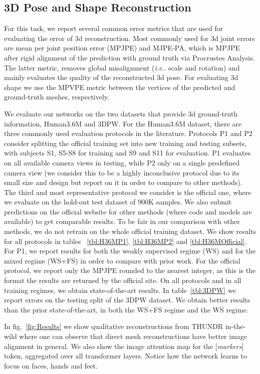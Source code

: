 \documentclass[10pt,twocolumn,letterpaper]{article}
\makeatletter
\DeclareRobustCommand\onedot{\futurelet\@let@token\@onedot}
\def\@onedot{\ifx\@let@token.\else.\null\fi\xspace}
\def\ie{\emph{i.e}\onedot} \def\Ie{\emph{I.e}\onedot}
\makeatother
\begin{document}
\subsection{3D Pose and Shape Reconstruction}

For this task, we report several common error metrics that are used for
evaluating the error of 3d reconstruction. Most commonly used for 3d joint errors are mean per joint position error (MPJPE) and MJPE-PA, which is MPJPE after rigid alignment of the prediction with ground truth via Procrustes Analysis. The latter metric, removes global misalignment (\ie scale and rotation) and mainly evaluates the quality of the reconstructed 3d pose. For evaluating 3d shape we use the MPVPE metric between the vertices of the predicted and ground-truth meshes, respectively.

We evaluate our networks on the two datasets that provide 3d ground-truth information, Human3.6M and 3DPW. For the Human3.6M dataset, there are three commonly used evaluation protocols in the literature. Protocols P1 and P2 consider splitting the official training set into new training and testing subsets, with subjects S1, S5-S8 for training and S9 and S11 for evaluation. P1 evaluates on all available camera views in testing, while P2 only on a single predefined camera view (we consider this to be a highly inconclusive protocol due to its small size and design but report on it in order to compare to other methods). The third and most representative protocol we consider is the official one, where we evaluate on the hold-out test dataset of 900K samples. We also submit predictions on the official website for other methods (where code and models are available) to get comparable results. To be fair in our comparison with other methods, we do not retrain on the whole official training dataset.  We show results for all protocols in tables ~\ref{tbl:H36MP1}, \ref{tbl:H36MP2} and \ref{tbl:H36MOfficial}. For P1, we report results for both the weakly supervised regime (WS) and for the mixed regime (WS+FS) in order to compare with prior work. For the official protocol, we report only the MPJPE rounded to the nearest integer, as this is the format the results are returned by the official site. On all protocols and in all training regimes, we obtain state-of-the-art results. In table~\ref{tbl:3DPW} we report errors on the testing split of the 3DPW dataset. We obtain better results than the prior state-of-the-art, in both the WS+FS regime and the WS regime.

In fig.~\ref{fig:Results} we show qualitative reconstructions from THUNDR in-the-wild where one can observe that direct mesh reconstructions  have better image alignment in general. We also show the image attention map for the [\textit{markers}] token, aggregated over all transformer layers. Notice how the network learns to focus on faces, hands and feet.
\vspace{-7mm}
\end{document}
